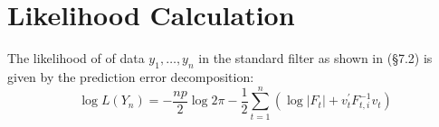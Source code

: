 \documentclass[12pt]{article}
\begin{document}
	



\section{Likelihood Calculation}
	The likelihood of of data $y_1, \dots, y_n$ in the standard filter as shown in \cite{dk_book} (\S 7.2) is given by the prediction error decomposition:
	\begin{equation*}
	\log L(Y_n) = -\frac{np}{2} \log 2\pi - \frac{1}{2} \sum_{t=1}^n \left(\log |F_t| + v_t^\prime F_{t,i}^{-1} v_t \right)
	\end{equation*}
	
\end{document}
